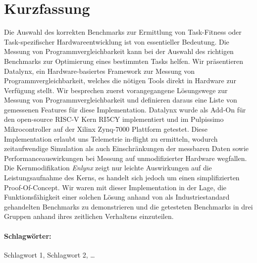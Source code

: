 \documentclass[bachelor_paper.tex]{subfiles}
\begin{document}
\section*{Kurzfassung}\thispagestyle{empty}
    \label{chap:kurzfassung}

    Die Auswahl des korrekten Benchmarks zur Ermittlung von Task-Fitness oder Task-spezifischer Hardwareentwicklung ist von essentieller Bedeutung. Die Messung von Programmvergleichbarkeit kann bei der Auswahl des richtigen Benchmarks zur Optimierung eines bestimmten Tasks helfen. Wir präsentieren Datalynx, ein Hardware-basiertes Framework zur Messung von Programmvergleichbarkeit, welches die nötigen Tools direkt in Hardware zur Verfügung stellt. Wir besprechen zuerst vorangegangene Lösungswege zur Messung von Programmvergleichbarkeit und definieren daraus eine Liste von gemessenen Features für diese Implementation. Datalynx wurde als Add-On für den open-source RISC-V Kern RI5CY implementiert und im Pulpissimo Mikrocontroller auf der Xilinx Zynq-7000 Plattform getestet. Diese Implementation erlaubt uns Telemetrie in-flight zu ermitteln, wodurch zeitaufwendige Simulation als auch Einschränkungen der messbaren Daten sowie Performanceauswirkungen bei Messung auf unmodifizierter Hardware wegfallen. Die Kernmodifikation \emph{Enlynx} zeigt nur leichte Auswirkungen auf die Leistungsaufnahme des Kerns, es handelt sich jedoch um einen simplifizierten Proof-Of-Concept. Wir waren mit dieser Implementation in der Lage, die Funktionsfähigkeit einer solchen Lösung anhand von als Industriestandard gehandelten Benchmarks zu demonstrieren und die getesteten Benchmarks in drei Gruppen anhand ihres zeitlichen Verhaltens einzuteilen.
    
    \vfill
\paragraph*{Schlagwörter:} Schlagwort 1, Schlagwort 2, \dots
{}

\isstandalone



\fi
\end{document}

